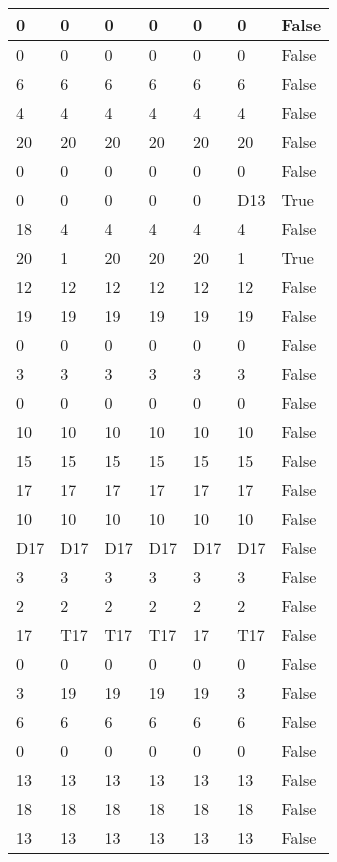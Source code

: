 \begin{longtable}[htbp]{| p{} | p{} | p{}| p{}| p{}| p{}| p{}|}
0 & 0 & 0 & 0 & 0 & 0 & False \\ \hline
0 & 0 & 0 & 0 & 0 & 0 & False \\ \hline
6 & 6 & 6 & 6 & 6 & 6 & False \\ \hline
4 & 4 & 4 & 4 & 4 & 4 & False \\ \hline
20 & 20 & 20 & 20 & 20 & 20 & False \\ \hline
0 & 0 & 0 & 0 & 0 & 0 & False \\ \hline
0 & 0 & 0 & 0 & 0 & \multicolumn{1}{l|}{D13} & True \\ \hline
18 & 4 & 4 & 4 & 4 & 4 & False \\ \hline
20 & 1 & 20 & 20 & 20 & 1 & True \\ \hline
12 & 12 & 12 & 12 & 12 & 12 & False \\ \hline
19 & 19 & 19 & 19 & 19 & 19 & False \\ \hline
0 & 0 & 0 & 0 & 0 & 0 & False \\ \hline
3 & 3 & 3 & 3 & 3 & 3 & False \\ \hline
0 & 0 & 0 & 0 & 0 & 0 & False \\ \hline
10 & 10 & 10 & 10 & 10 & 10 & False \\ \hline
15 & 15 & 15 & 15 & 15 & 15 & False \\ \hline
17 & 17 & 17 & 17 & 17 & 17 & False \\ \hline
10 & 10 & 10 & 10 & 10 & 10 & False \\ \hline
\multicolumn{1}{|l|}{D17} & \multicolumn{1}{l|}{D17} & \multicolumn{1}{l|}{D17} & \multicolumn{1}{l|}{D17} & \multicolumn{1}{l|}{D17} & \multicolumn{1}{l|}{D17} & False \\ \hline
3 & 3 & 3 & 3 & 3 & 3 & False \\ \hline
2 & 2 & 2 & 2 & 2 & 2 & False \\ \hline
17 & \multicolumn{1}{l|}{T17} & \multicolumn{1}{l|}{T17} & \multicolumn{1}{l|}{T17} & 17 & \multicolumn{1}{l|}{T17} & False \\ \hline
0 & 0 & 0 & 0 & 0 & 0 & False \\ \hline
3 & 19 & 19 & 19 & 19 & 3 & False \\ \hline
6 & 6 & 6 & 6 & 6 & 6 & False \\ \hline
0 & 0 & 0 & 0 & 0 & 0 & False \\ \hline
13 & 13 & 13 & 13 & 13 & 13 & False \\ \hline
18 & 18 & 18 & 18 & 18 & 18 & False \\ \hline
13 & 13 & 13 & 13 & 13 & 13 & False \\ \hline

\end{longtable}
